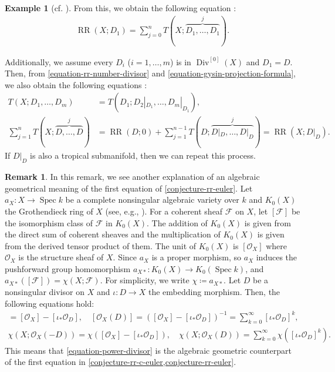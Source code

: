 \documentclass[a4paper,dvipdfmx,reqno,12pt]{amsart}
\theoremstyle{definition}
\newtheorem{example}[theorem]{Example}
\newtheorem{remark}[theorem]{Remark}
\newcommand{\deq}{\coloneqq}
\newcommand{\opn}[1]{\operatorname{#1}}
\numberwithin{equation}{section}
\begin{document}
\begin{example}[{cf. \cite[Chapter 13 Appendix]{MR2810322}}]
From this, we obtain the following equation
\cite[.(14)]{MR1335917}:
\begin{align}
\opn{RR}(X;D_1)=\sum_{j=0}^{n}T(X;\overbrace{D_1,\ldots,D_1}^{j}).
\end{align}

Additionally, we assume every $D_i$ ($i=1,\ldots,m$) is
in $\opn{Div}^{[0]}(X)$ and $D_1=D$.
Then, from 
\cref{equation-rr-number-divisor} and
\cref{equation-gysin-projection-formula},
we also obtain the following equations \cite[Theorem 11.2.1]{MR1335917}:
\begin{align}
T(X;D_1,\ldots,D_m)&=T(D_1;D_2|_{D_1},\ldots,D_m|_{D_1}), \\
\sum_{j=1}^{n}T(X;\overbrace{D,\ldots,D}^{j})
&=\opn{RR}(D;0)+\sum_{j=1}^{n-1}T(D;\overbrace{D|_D,\ldots,D|_{D}}^{j})
=\opn{RR}(X;D|_D).
\label{equation-rr-reduction}
\end{align}
If $D|_D$ is also a tropical submanifold,
then we can repeat this process.
\end{example}

\begin{remark}
\label{remark-grothendieck-group}
In this remark, we see another explanation
of an algebraic geometrical meaning of the first
equation of \cref{conjecture-rr-euler}.
Let $a_X\colon X\to \opn{Spec}k$
be a complete nonsingular algebraic variety over $k$
and $K_0(X)$ the Grothendieck ring of $X$
(see, e.g., \cite[]{MR1644323}).
For a coherent sheaf $\mathcal{F}$ on $X$, 
let $[\mathcal{F}]$ be the isomorphism class of
$\mathcal{F}$ in $K_0(X)$.
The addition of $K_0(X)$ is given from
the direct sum of coherent sheaves and
the multiplication of $K_0(X)$ is given
from the derived tensor product of them.   
The unit of $K_0(X)$ is $[\mathcal{O}_X]$
where $\mathcal{O}_X$ is the structure sheaf of $X$.
Since $a_X$ is a proper morphism, so $a_X$
induces the pushforward group homomorphism
$a_{X*}\colon K_0(X)\to K_0(\opn{Spec}k)$,
and $a_{X*}([\mathcal{F}])=
\chi(X;\mathcal{F})$.
For simplicity, we write $\chi\deq a_{X*}$.
Let $D$ be a nonsingular divisor on $X$ and 
$\iota\colon D\to X$ the embedding morphism.
Then, the following equations hold:
\begin{align}
[\mathcal{O}_X(-D)]=
[\mathcal{O}_X]-[\iota_*\mathcal{O}_{D}], \quad
[\mathcal{O}_X(D)]=
([\mathcal{O}_X]-[\iota_*\mathcal{O}_{D}])^{-1}
=\sum_{k=0}^{\infty}[\iota_*\mathcal{O}_D]^{k}, \\
\chi(X;\mathcal{O}_X(-D))=
\chi([\mathcal{O}_X]-[\iota_*\mathcal{O}_{D}]), \quad
\chi(X;\mathcal{O}_X(D))=
\sum_{k=0}^{\infty}\chi([\iota_*\mathcal{O}_D]^{k}).
\label{equation-power-divisor}
\end{align}
This means that \eqref{equation-power-divisor} is 
the algebraic geometric counterpart of
the first equation in
\cref{conjecture-rr-c-euler,conjecture-rr-euler}.
\end{remark}
\end{document}
